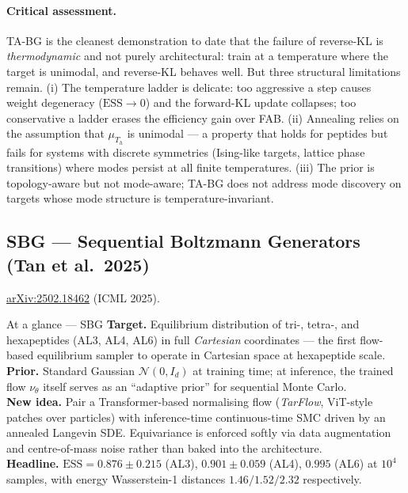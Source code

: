 \documentclass[11pt,letterpaper]{article}
\newcommand{\ESS}{\mathrm{ESS}}
\theoremstyle{plain}
\begin{document}
\paragraph{Critical assessment.} TA-BG is the cleanest demonstration to date
that the failure of reverse-KL is \emph{thermodynamic} and not purely
architectural: train at a temperature where the target is unimodal, and
reverse-KL behaves well. But three structural limitations remain. (i) The
temperature ladder is delicate: too aggressive a step causes weight
degeneracy ($\ESS\to 0$) and the forward-KL update collapses; too
conservative a ladder erases the efficiency gain over FAB. (ii) Annealing
relies on the assumption that $\mu_{T_h}$ is unimodal --- a property that
holds for peptides but fails for systems with discrete symmetries
(Ising-like targets, lattice phase transitions) where modes persist at all
finite temperatures. (iii) The prior is topology-aware but not mode-aware;
TA-BG does not address mode discovery on targets whose mode structure is
temperature-invariant.

\subsection{SBG --- Sequential Boltzmann Generators (Tan et al.\ 2025)}

\href{https://arxiv.org/abs/2502.18462}{arXiv:2502.18462} (ICML 2025).

\begin{methodbox}{At a glance --- SBG}
\textbf{Target.} Equilibrium distribution of tri-, tetra-, and hexapeptides
(AL3, AL4, AL6) in full \emph{Cartesian} coordinates --- the first flow-based
equilibrium sampler to operate in Cartesian space at hexapeptide scale. \\
\textbf{Prior.} Standard Gaussian $\mathcal N(0,I_d)$ at training time; at
inference, the trained flow $\nu_\theta$ itself serves as an ``adaptive
prior'' for sequential Monte Carlo. \\
\textbf{New idea.} Pair a Transformer-based normalising flow (\emph{TarFlow},
ViT-style patches over particles) with inference-time continuous-time SMC
driven by an annealed Langevin SDE. Equivariance is enforced softly via data
augmentation and centre-of-mass noise rather than baked into the architecture. \\
\textbf{Headline.} $\ESS=0.876\pm 0.215$ (AL3), $0.901\pm 0.059$ (AL4),
$0.995$ (AL6) at $10^4$ samples, with energy Wasserstein-1 distances
$1.46/1.52/2.32$ respectively.
\end{methodbox}
\end{document}

